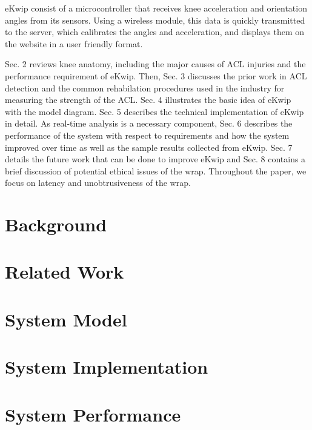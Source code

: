 \documentclass{sig-alternate}
\begin{document}
eKwip consist of a microcontroller that receives knee acceleration and orientation angles from its sensors. Using a wireless module, this data is quickly transmitted to the server, which calibrates the angles and acceleration, and displays them on the website in a user friendly format.

Sec. 2 reviews knee anatomy, including the major causes of ACL injuries and the performance requirement of eKwip. Then, Sec. 3 discusses the prior work in ACL detection and the common rehabilation procedures used in the industry for measuring the strength of the ACL. Sec. 4 illustrates the basic idea of eKwip with the model diagram. Sec. 5 describes the technical implementation of eKwip in detail. As real-time analysis is a necessary component, Sec. 6 describes the performance of the system with respect to requirements and how the system improved over time as well as the sample results collected from eKwip. Sec. 7 details the future work that can be done to improve eKwip and Sec. 8 contains a brief discussion of potential ethical issues of the wrap. Throughout the paper, we focus on latency and unobtrusiveness of the wrap.

\section{Background}
\label{sec:background}


\section{Related Work}
\label{sec:related_work}


\section{System Model}
\label{sec:system_model}


\section{System Implementation}
\label{sec:system_implementation}


\section{System Performance}
\label{sec:system_performance}

\end{document}
